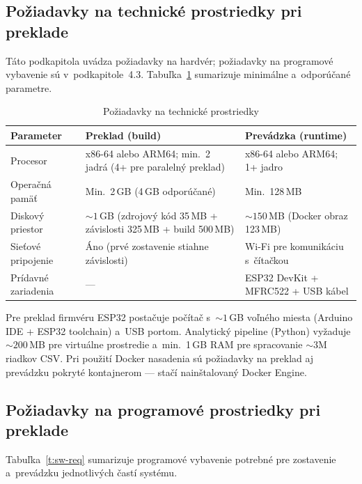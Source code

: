 \documentclass[a4paper]{feidipsp}
\begin{document}
\subsection{Požiadavky na technické prostriedky pri preklade}

Táto podkapitola uvádza požiadavky na hardvér; požiadavky na programové vybavenie sú v~podkapitole~4.3. Tabuľka~\ref{t:hw-req} sumarizuje minimálne a~odporúčané parametre.

\begin{table}[!htbp]
\centering
\footnotesize
\renewcommand{\arraystretch}{1.15}
\caption{Požiadavky na technické prostriedky}\label{t:hw-req}
\begin{tabular}{|l|p{4.5cm}|p{4.5cm}|} \hline
\textbf{Parameter} & \textbf{Preklad (build)} & \textbf{Prevádzka (runtime)} \\ \hline
Procesor & x86-64 alebo ARM64; min.\ 2 jadrá (4+ pre paralelný preklad) & x86-64 alebo ARM64; 1+ jadro \\ \hline
Operačná pamäť & Min.\ 2\,GB (4\,GB odporúčané) & Min.\ 128\,MB \\ \hline
Diskový priestor & ${\sim}1$\,GB (zdrojový kód 35\,MB + závislosti 325\,MB + build 500\,MB) & ${\sim}150$\,MB (Docker obraz 123\,MB) \\ \hline
Sieťové pripojenie & Áno (prvé zostavenie stiahne závislosti) & Wi-Fi pre komunikáciu s~čítačkou \\ \hline
Prídavné zariadenia & --- & ESP32 DevKit + MFRC522 + USB kábel \\ \hline
\end{tabular}
\end{table}

\noindent Pre preklad firmvéru ESP32 postačuje počítač s~${\sim}1$\,GB voľného miesta (Arduino IDE + ESP32 toolchain) a~USB portom. Analytický pipeline (Python) vyžaduje ${\sim}200$\,MB pre virtuálne prostredie a~min.\ 1\,GB RAM pre spracovanie ${\sim}3$M riadkov CSV. Pri použití Docker nasadenia sú požiadavky na preklad aj prevádzku pokryté kontajnerom --- stačí nainštalovaný Docker Engine.

\subsection{Požiadavky na programové prostriedky pri preklade}

Tabuľka~\ref{t:sw-req} sumarizuje programové vybavenie potrebné pre zostavenie a~prevádzku jednotlivých častí systému.
\end{document}
